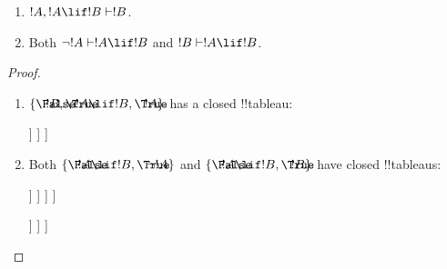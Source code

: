 \documentclass[../../../include/open-logic-section]{subfiles}
\begin{document}
\begin{prop}
  \begin{enumerate}
  \item {}  $!A, !A \lif !B \Proves !B$.
  \item {}
    Both $\lnot !A \Proves !A \lif !B$ and $!B \Proves !A \lif !B$.
  \end{enumerate}
\end{prop}

\begin{proof}
  \begin{enumerate}
    \item $\{\sFmla{\False}{!B}, \sFmla{\True}{!A \lif !B},
      \sFmla{\True}{!A}\}$ has a closed !!{tableau}:
      \begin{oltableau}
        [\sFmla{\False}{\formula{B}}, just=\TAss
          [\sFmla{\True}{\formula{A} \lif \formula{B}}, just=\TAss
            [\sFmla{\True}{\formula{A}}, just=\TAss
              [\sFmla{\False}{\formula{A}}, just = {\TRule{\True}{\lif}[2]}, close]
              [\sFmla{\True}{\formula{B}}, just = {\TRule{\True}{\lif}[2]}, close]
            ]
          ]
        ]
      \end{oltableau}
    \item Both $\{\sFmla{\False}{!A \lif !B},
      \sFmla{\True}{\lnot !A}\}$ and $\{\sFmla{\False}{!A \lif !B},
      \sFmla{\True}{!B}\}$ have closed !!{tableau}s:
      \begin{oltableau}
        [\sFmla{\False}{\formula{A} \lif \formula{B}}, just = \TAss
          [\sFmla{\True}{\lnot \formula{A}}, just = \TAss
            [\sFmla{\True}{\formula{A}}, just = {\TRule{\False}{\lif}[1]}
              [\sFmla{\False}{\formula{B}}, just = {\TRule{\False}{\lif}[1]}
                [\sFmla{\False}{\formula{A}}, just = {\TRule{\True}{\lnot}[2]}, close]
              ]
            ]
          ]
        ]
      \end{oltableau}
      \begin{oltableau}
        [\sFmla{\False}{\formula{A} \lif \formula{B}}, just = \TAss
          [\sFmla{\True}{\formula{B}}, just = \TAss
            [\sFmla{\True}{\formula{A}}, just = {\TRule{\False}{\lif}[1]}
              [\sFmla{\False}{\formula{B}}, just = {\TRule{\False}{\lif}[1]},close
              ]
            ]
          ]
        ]
      \end{oltableau}
  \end{enumerate}
\end{proof}
\end{document}
